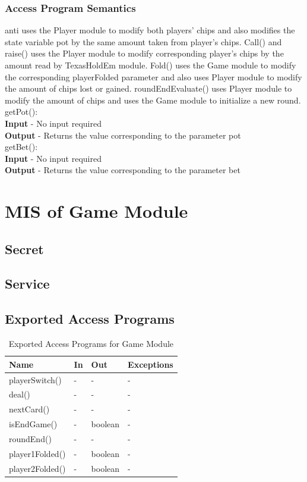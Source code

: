 \documentclass[11pt]{article}
\begin{document}
    \subsubsection{Access Program Semantics}
    anti uses the Player module to modify both players' chips and also modifies the state variable pot by the same amount taken from player's chips. Call() and raise() uses the Player module to modify corresponding player's chips by the amount read by TexasHoldEm module. Fold() uses the Game module to modify the corresponding playerFolded parameter and also uses Player module to modify the amount of chips lost or gained. roundEndEvaluate() uses Player module to modify the amount of chips and uses the Game module to initialize a new round. \\
    getPot():\\
    \textbf{Input} - No input required\\
    \textbf{Output} - Returns the value corresponding to the parameter pot\\
    getBet():\\
    \textbf{Input} - No input required\\
    \textbf{Output} - Returns the value corresponding to the parameter bet
    \newline
     \section{MIS of Game Module}
     \subsection{Secret}
    \subsection{Service}
    \subsection{Exported Access Programs}
    \begin{table}[h]
    \caption{Exported Access Programs for Game Module}
    \begin{tabular}{p{4cm}p{2cm}p{2cm}p{4cm}}
    Name & In & Out & Exceptions\\
    \hline
    playerSwitch() & - & - & -\\
    \hline
    deal() & - & - & -\\
    \hline
    nextCard() & - & - & -\\
    \hline
    isEndGame() & - & boolean & -\\
    \hline
    roundEnd() & - & - & - \\
    \hline
    player1Folded() & - & boolean & - \\
    \hline
    player2Folded() & - & boolean & - \\
    
    \end{tabular}
    \end{table}
\end{document}
